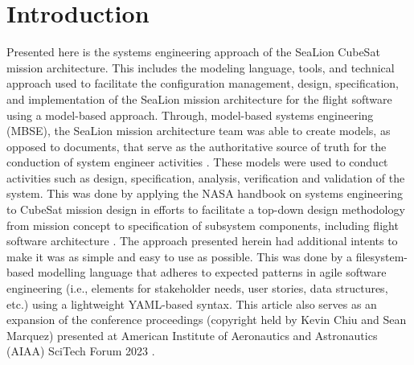 \documentclass[journal,article,submit,pdftex,moreauthors]{Definitions/mdpi}
\begin{document}

\section{Introduction}

Presented here is the systems engineering approach of the SeaLion CubeSat mission architecture.  This includes the modeling language, tools, and technical approach used to facilitate the configuration management, design, specification, and implementation of the SeaLion mission architecture for the flight software using a model-based approach.  Through, model-based systems engineering (MBSE), the SeaLion mission architecture team was able to create models, as opposed to documents, that serve as the authoritative source of truth for the conduction of system engineer activities \cite{architecting_spacecraft}.  These models were used to conduct activities such as design, specification, analysis, verification and validation of the system.  This was done by applying the NASA handbook on systems engineering \cite{nasa_handbook} to CubeSat mission design in efforts to facilitate a top-down design methodology from mission concept to specification of subsystem components, including flight software architecture \cite{asundi13_cubes}.  The approach presented herein had additional intents to make it was as simple and easy to use as possible.  This was done by a filesystem-based modelling language that adheres to expected patterns in agile software engineering (i.e., elements for stakeholder needs, user stories, data structures, etc.) using a lightweight YAML-based syntax.  This article also serves as an expansion of the conference proceedings (copyright held by Kevin Chiu and Sean Marquez) presented at American Institute of Aeronautics and Astronautics (AIAA) SciTech Forum 2023 \cite{scitech_proceeding}.
\end{document}
